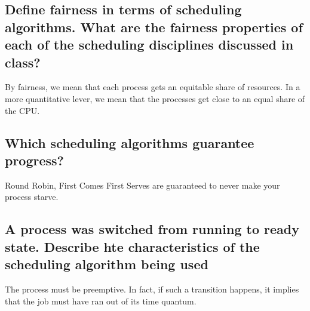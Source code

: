 \documentclass[a4paper]{article}
\begin{document}
\subsection{Define fairness in terms of scheduling algorithms. What are the fairness properties of each of the scheduling disciplines discussed in class?} %
\label{sub:Define fairness in terms of scheduling algorithms. What are hte fairness properties of each of hte scheduling disciplines discussed in class?}
By fairness, we mean that each process gets an equitable share of resources. In a more quantitative lever, we mean that the processes
get close to an equal share of the CPU.
\subsection{Which scheduling algorithms guarantee progress?} %
\label{sub:Which scheduling algorithms guarantee progress?}
Round Robin, First Comes First Serves are guaranteed to never make your process starve.
\subsection{A process was switched from running to ready state. Describe hte characteristics of the scheduling algorithm being used} %
\label{sub:A process was switrhed from running to ready state. Describe hte characteristics of the scheduling algorithm being used}
The process must be preemptive. In fact, if such a transition happens, it implies that the job must have ran out of its time quantum.
\end{document}
